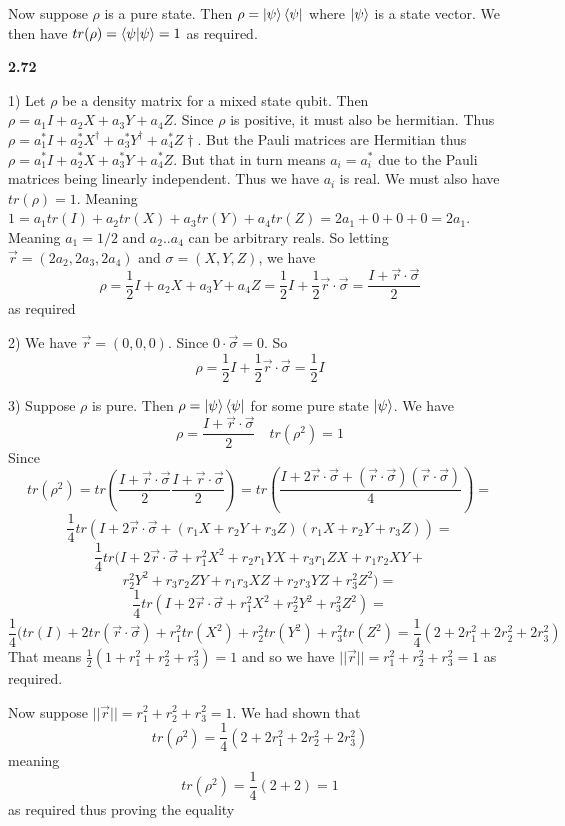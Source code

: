 Now suppose $\rho$ is a pure state. Then $\rho = \ket{\psi}\bra{\psi}$ where $\ket{\psi}$ is a state vector. We then have $ tr(\rho) = \braket{\psi| \psi} = 1$ as required.

\textbf{2.72}

1) Let $\rho$ be a density matrix for a mixed state qubit. Then $ \rho = a_1I + a_2 X + a_3 Y + a_4 Z$. Since $\rho$ is positive, it must also be hermitian. Thus $\rho = a_1^*I + a_2^* X^\dag + a_3^* Y^\dag + a_4^*Z\dag$. But the Pauli matrices are Hermitian thus $\rho = a_1^*I + a_2^* X + a_3^* Y + a_4^*Z$. But that in turn means $ a_i = a_i^*$ due to the Pauli matrices being linearly independent. Thus we have $ a_i$ is real. We must also have $tr(\rho) = 1$. Meaning $1 = a_1tr(I) + a_2tr(X) + a_3tr(Y) + a_4tr(Z) = 2a_1 + 0 +0+0 = 2a_1$. Meaning $a_1 = 1/2$ and $a_2..a_4$ can be arbitrary reals. So letting $\vec{r} = (2a_2,2a_3,2a_4)$ and $ \sigma = (X, Y, Z)$, we have \[\rho = \frac{1}{2}I+ a_2X + a_3 Y + a_4 Z = \frac{1}{2}I  + \frac{1}{2}\vec{r} \cdot \vec{\sigma}=\frac{I + \vec{r}\cdot \vec{\sigma}}{2}\] as required

2) We have $ \vec{r} = (0,0,0)$. Since $ 0\cdot \vec{\sigma} = 0$. So
\[\rho = \frac{1}{2}I +\frac{1}{2}\vec{r}\cdot\vec{\sigma} = \frac{1}{2}I\]

3) Suppose $\rho$ is pure. Then $ \rho = \ket{\psi}\bra{\psi}$ for some pure state $ \ket{\psi}$. We have \[\rho= \frac{I + \vec{r}\cdot \vec{\sigma}}{2}\quad tr(\rho^2) = 1\] Since \[tr(\rho^2) = tr\left(\frac{I + \vec{r}\cdot \vec{\sigma}}{2}\frac{I + \vec{r}\cdot \vec{\sigma}}{2}\right) = tr\left(\frac{I + 2\vec{r}\cdot \vec{\sigma} + (\vec{r}\cdot \vec{\sigma})(\vec{r}\cdot \vec{\sigma})}{4}\right) = \]
\[\frac{1}{4}tr\left(I + 2\vec{r}\cdot \vec{\sigma} + (r_1X +r_2 Y + r_3 Z) (r_1X +r_2 Y + r_3 Z)   \right)  = \]
\[\frac{1}{4}tr(I + 2\vec{r}\cdot \vec{\sigma} + r_1^2X^2 +r_2r_1 YX + r_3r_1 ZX + r_1r_2XY +\]\[r_2^2Y^2 + r_3r_2ZY + r_1r_3XZ +r_2r_3 YZ + r_3^2 Z^2 ) = \]
\[\frac{1}{4}tr(I + 2\vec{r}\cdot \vec{\sigma} + r_1^2 X^2 + r_2^2 Y^2 + r_3^2 Z^2) =\] \[\frac{1}{4}(tr(I) + 2tr(\vec{r}\cdot \vec{\sigma}) + r_1^2 tr(X^2) + r_2^2 tr(Y^2) + r_3^2 tr(Z^2) = \frac{1}{4}(2 +2r_1^2+2r_2^2 + 2r_3^2)\]
That means $\frac{1}{2}(1+r_1^2 +r_2^2 + r_3^2) = 1$ and so we have $||\vec{r}|| =r_1^2 +r_2^2 + r_3^2 = 1$ as required. 

Now suppose $ ||\vec{r}|| =r_1^2 +r_2^2 + r_3^2 = 1$. We had shown that \[tr(\rho^2) = \frac{1}{4}(2 +2r_1^2+2r_2^2 + 2r_3^2)\] meaning \[tr(\rho^2) = \frac{1}{4}(2+ 2) = 1\] as required thus proving the equality

